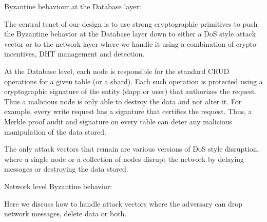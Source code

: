 Byzantine behaviour at the Database layer:

The central tenet of our design is to use strong cryptographic primitives to push the Byzantine behavior at the Database layer down to either a DoS style attack vector or to the network layer where we handle it using a combination of crypto-incentives, DHT management and detection.

At the Database level, each node is responsible for the standard CRUD operations for a given table (or a shard). Each such operation is protected using a cryptographic signature of the entity (dapp or user) that authorizes the request. Thus a malicious node is only able to destroy the data and not alter it. For example, every write request has a signature that certifies the request. Thus, a Merkle proof audit and signature on every table can deter any malicious manipulation of the data stored. 

The only attack vectors that remain are various versions of DoS style disruption, where a single node or a collection of nodes disrupt the network by delaying messages or destroying the data stored. 

Network level Byzantine behavior:

Here we discuss how to handle attack vectors where the adversary can drop network messages, delete data or both. 

